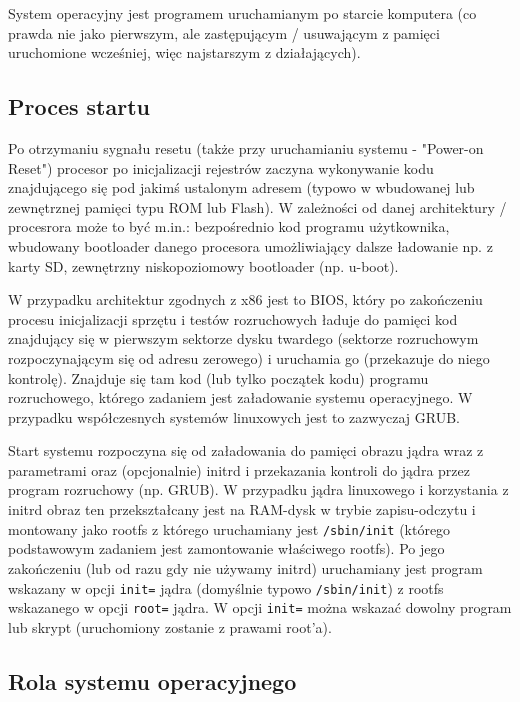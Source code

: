System operacyjny jest programem uruchamianym po starcie komputera (co prawda nie jako pierwszym, ale zastępującym / usuwającym z pamięci uruchomione wcześniej, więc najstarszym z działających).

\subsection{Proces startu}

Po otrzymaniu sygnału resetu (także przy uruchamianiu systemu - "Power-on Reset") procesor po inicjalizacji rejestrów zaczyna wykonywanie kodu znajdującego się pod jakimś ustalonym adresem (typowo w wbudowanej lub zewnętrznej pamięci typu ROM lub Flash). W zależności od danej architektury / procesrora może to być m.in.: bezpośrednio kod programu użytkownika, wbudowany bootloader danego procesora umożliwiający dalsze ładowanie np. z karty SD, zewnętrzny niskopoziomowy bootloader (np. u-boot).

W przypadku architektur zgodnych z x86 jest to BIOS, który po zakończeniu procesu inicjalizacji sprzętu i testów rozruchowych ładuje do pamięci kod znajdujący się w pierwszym sektorze dysku twardego (sektorze rozruchowym rozpoczynającym się od adresu zerowego) i uruchamia go (przekazuje do niego kontrolę). Znajduje się tam kod (lub tylko początek kodu) programu rozruchowego, którego zadaniem jest załadowanie systemu operacyjnego. W przypadku współczesnych systemów linuxowych jest to zazwyczaj GRUB.

Start systemu rozpoczyna się od załadowania do pamięci obrazu jądra wraz z parametrami oraz (opcjonalnie) initrd i przekazania kontroli do jądra przez program rozruchowy (np. GRUB). W przypadku jądra linuxowego i korzystania z initrd obraz ten przekształcany jest na RAM-dysk w trybie zapisu-odczytu i montowany jako rootfs z którego uruchamiany jest \Verb#/sbin/init# (którego podstawowym zadaniem jest zamontowanie właściwego rootfs). Po jego zakończeniu (lub od razu gdy nie używamy initrd) uruchamiany jest program wskazany w opcji \Verb#init=# jądra (domyślnie typowo \Verb#/sbin/init#) z rootfs wskazanego w opcji \Verb#root=# jądra. W opcji \Verb#init=# można wskazać dowolny program lub skrypt (uruchomiony zostanie z prawami root'a).

\subsection{Rola systemu operacyjnego}

